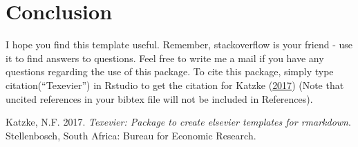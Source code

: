 \documentclass[11pt,preprint, authoryear]{elsarticle}
\numberwithin{equation}{section}
\numberwithin{figure}{section}
\numberwithin{table}{section}
\newlength{\cslhangindent}
\newenvironment{CSLReferences}%
  {\setlength{\parindent}{0pt}%
  \everypar{\setlength{\hangindent}{\cslhangindent}}\ignorespaces}%
  {\par}
\begin{document}
\hypertarget{conclusion}{%
\section{Conclusion}\label{conclusion}}

I hope you find this template useful. Remember, stackoverflow is your
friend - use it to find answers to questions. Feel free to write me a
mail if you have any questions regarding the use of this package. To
cite this package, simply type citation(``Texevier'') in Rstudio to get
the citation for Katzke (\protect\hyperlink{ref-Texevier}{2017}) (Note
that uncited references in your bibtex file will not be included in
References).

\newpage

\hypertarget{refs}{}
\begin{CSLReferences}{1}{0}
\leavevmode{}%
Katzke, N.F. 2017. \emph{{Texevier}: {P}ackage to create elsevier
templates for rmarkdown}. Stellenbosch, South Africa: Bureau for
Economic Research.

\end{CSLReferences}


\end{document}
